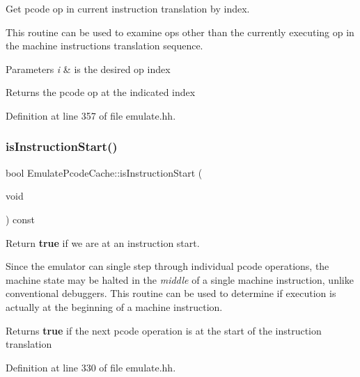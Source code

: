 Get pcode op in current instruction translation by index. 

This routine can be used to examine ops other than the currently executing op in the machine instruction\textquotesingle{}s translation sequence. 
\begin{DoxyParams}{Parameters}
{\em i} & is the desired op index \\
\hline
\end{DoxyParams}
\begin{DoxyReturn}{Returns}
the pcode op at the indicated index 
\end{DoxyReturn}


Definition at line 357 of file emulate.\+hh.

\mbox{\label{class_emulate_pcode_cache_a2181035b11cf4b7df9e67c95aaedbed6}} 
\subsubsection{\texorpdfstring{isInstructionStart()}{isInstructionStart()}}
{\footnotesize\ttfamily bool Emulate\+Pcode\+Cache\+::is\+Instruction\+Start (\begin{DoxyParamCaption}\item[{void}]{ }\end{DoxyParamCaption}) const\hspace{0.3cm}{\ttfamily [inline]}}



Return {\bfseries{true}} if we are at an instruction start. 

Since the emulator can single step through individual pcode operations, the machine state may be halted in the {\itshape middle} of a single machine instruction, unlike conventional debuggers. This routine can be used to determine if execution is actually at the beginning of a machine instruction. \begin{DoxyReturn}{Returns}
{\bfseries{true}} if the next pcode operation is at the start of the instruction translation 
\end{DoxyReturn}


Definition at line 330 of file emulate.\+hh.

\mbox{\label{class_emulate_pcode_cache_a8f19e816af73f36a2d2c6633aba71711}} 
